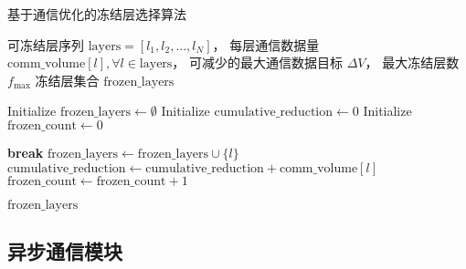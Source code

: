 \begin{algorithm}[!h]
    \caption{基于通信优化的冻结层选择算法}
    \label{alg:freeze_selector_communication_aware}
    \renewcommand{\algorithmicrequire}{\textbf{Input:}}
    \renewcommand{\algorithmicensure}{\textbf{Output:}}
    \begin{algorithmic}[1]
        \REQUIRE 
            可冻结层序列 $\text{layers} = [l_1, l_2, ..., l_N]$，
            每层通信数据量 $\text{comm\_volume}[l], \forall l \in \text{layers}$，
            可减少的最大通信数据目标 $\Delta V$，
            最大冻结层数 $f_{\text{max}}$
        \ENSURE 冻结层集合 $\text{frozen\_layers}$
        
        \STATE Initialize $\text{frozen\_layers} \leftarrow \emptyset$
        \STATE Initialize $\text{cumulative\_reduction} \leftarrow 0$
        \STATE Initialize $\text{frozen\_count} \leftarrow 0$

                \STATE \textbf{break}
            \ENDIF
            \STATE $\text{frozen\_layers} \leftarrow \text{frozen\_layers} \cup \{l\}$
            \STATE $\text{cumulative\_reduction} \leftarrow \text{cumulative\_reduction} + \text{comm\_volume}[l]$
            \STATE $\text{frozen\_count} \leftarrow \text{frozen\_count} + 1$
        \ENDFOR
        
        \RETURN $\text{frozen\_layers}$
    \end{algorithmic}
\end{algorithm}

\subsection{异步通信模块}

